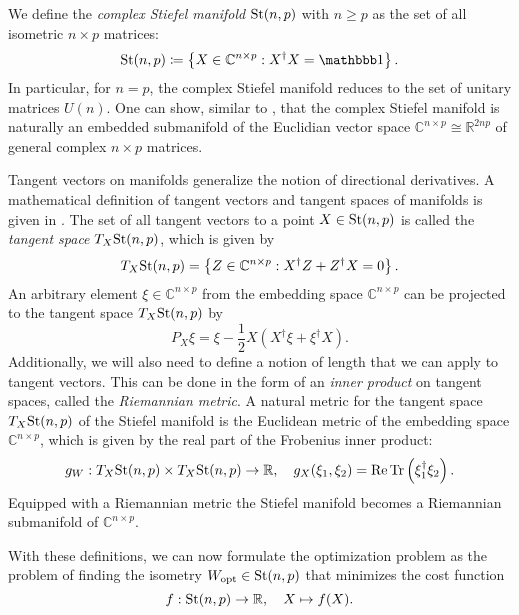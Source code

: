 We define the \textit{complex Stiefel manifold} $\text{St}(n,p)$ with $n \ge p$ as the set of all isometric $n\times p$ matrices:
\begin{equation}
	\label{eq:Stiefel_manifold_definition}
	\Stiefel \coloneqq \left\{X\in\mathbb{C}^{n\times p}: X^\dagger X = \id\right\}.
\end{equation}
In particular, for $n = p$, the complex Stiefel manifold reduces to the set of unitary matrices $U(n)$. One can show, similar to \cite{cite:optimization_on_matrix_manifolds}, that the complex Stiefel manifold is naturally an embedded submanifold of the Euclidian vector space $\mathbb{C}^{n\times p} \cong \mathbb{R}^{2np}$ of general complex $n\times p$ matrices. \par
Tangent vectors on manifolds generalize the notion of directional derivatives. A mathematical definition of tangent vectors and tangent spaces of manifolds is given in \cite{cite:optimization_on_matrix_manifolds}. The set of all tangent vectors to a point $X\in\text{St}(n,p)$ is called the \textit{tangent space} $T_X \text{St}(n,p)$, which is given by \cite{cite:optimization_on_matrix_manifolds, cite:riemannian_optimization_isometric_tensor_networks}
\begin{equation}
	\label{eq:Stiefel_manifold_tangent_space}
	T_X \text{St}(n,p) = \left\{Z\in\mathbb{C}^{n\times p}:X^\dagger Z + Z^\dagger X = 0\right\}.
\end{equation}
An arbitrary element $\xi \in \mathbb{C}^{n\times p}$ from the embedding space $\mathbb{C}^{n\times p}$ can be projected to the tangent space $T_X \text{St}(n,p)$ by \cite{cite:optimization_on_matrix_manifolds, cite:riemannian_optimization_isometric_tensor_networks}
\begin{equation}
	\label{eq:Stiefel_manifold_project_to_tangent_space}
	P_X\xi = \xi - \frac{1}{2}X\left(X^\dagger\xi + \xi^\dagger X\right).
\end{equation}
Additionally, we will also need to define a notion of length that we can apply to tangent vectors. This can be done in the form of an \textit{inner product} on tangent spaces, called the \textit{Riemannian metric}. A natural metric for the tangent space $T_X \text{St}(n,p)$ of the Stiefel manifold is the Euclidean metric of the embedding space $\mathbb{C}^{n\times p}$, which is given by the real part of the Frobenius inner product:
\begin{equation}
	\label{eq:Stiefel_manifold_riemannian_metric}
	g_W: T_X \text{St}(n,p) \times T_X \text{St}(n,p) \to \mathbb{R}, \quad g_X(\xi_1, \xi_2) = \operatorname{Re}\operatorname{Tr}\left(\xi_1^\dagger\xi_2\right).
\end{equation}
Equipped with a Riemannian metric the Stiefel manifold becomes a Riemannian submanifold of $\mathbb{C}^{n\times p}$. \par
With these definitions, we can now formulate the optimization problem as the problem of finding the isometry $W_\text{opt} \in \text{St}(n,p)$ that minimizes the cost function
\begin{equation}
	\label{eq:Optimization_cost_function_definition}
	f: \text{St}(n,p) \to \mathbb{R}, \quad X \mapsto f(X).
\end{equation}